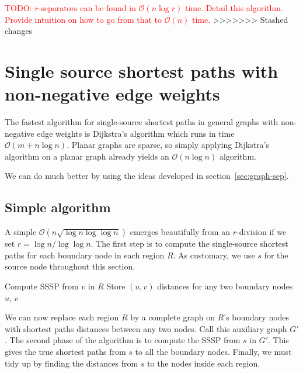 \documentclass[11pt]{article}
\begin{document}
\textcolor{red}{TODO: $r$-separators can be found in $\mathcal{O}(n\log r)$ time. Detail this algorithm. Provide intuition on how to go from that to $\mathcal{O}(n)$ time.}
>>>>>>> Stashed changes

\section{Single source shortest paths with non-negative edge weights}
\label{sec:nonn-edge-weights}

The fastest algorithm for single-source shortest paths in general graphs with non-negative edge weights is Dijkstra's algorithm which runs in time $\mathcal{O}(m + n\log n)$. Planar graphs are sparse, so simply applying Dijkstra's algorithm on a planar graph already yields an $\mathcal{O}(n \log n)$ algorithm.

We can do much better by using the ideas developed in section~\ref{sec:graph-sep}.

\subsection{Simple algorithm}
\label{sec:simple-algorithm}

A simple $\mathcal{O}(n\sqrt{\log n \log \log n})$ emerges beautifully from an $r$-division if we set $r = \log n/\log \log n$. The first step is to compute the single-source shortest paths for each boundary node in each region $R$. As customary, we use $s$ for the source node throughout this section.


\begin{algorithm}[!htb]
  \label{alg:sssp-region}
  \begin{algorithmic}
        \State Compute SSSP from $v$ in $R$
        \State Store $(u,v)$ distances for any two boundary nodes $u$, $v$
      \EndFor
    \EndFor
  \end{algorithmic}
\end{algorithm}

 We can now replace each region $R$ by a complete graph on $R$'s boundary nodes with shortest paths distances between any two nodes. Call this auxiliary graph $G'$. The second phase of the algorithm is to compute the SSSP from $s$ in $G'$. This gives the true shortest paths from $s$ to all the boundary nodes. Finally, we must tidy up by finding the distances from $s$ to the nodes inside each region.
\end{document}
